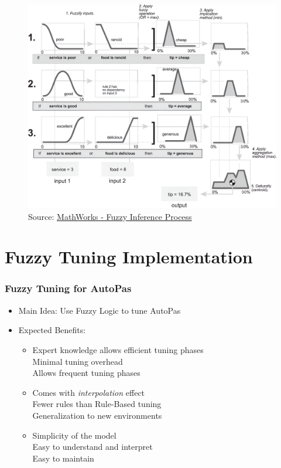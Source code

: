 \documentclass[
	10pt,
	t		%
]{beamer}
\newcommand{\cmark}{\ding{51}}%
\begin{document}
\begin{frame}
	\vspace{-0.8cm}
	\begin{figure}
		\centering
		\caption{\tiny{Source: \href{https://de.mathworks.com/help/fuzzy/fuzzy-inference-process.html}{MathWorks - Fuzzy Inference Process}}}
		\includegraphics[width=0.8\paperwidth]{figures/FullInferenceProcess.png}
	\end{figure}
	\label{fig:fuzzy_inference_full}
	
\end{frame}


\section{Fuzzy Tuning Implementation}
\begin{frame}
	\frametitle{Fuzzy Tuning for AutoPas}
	
	\begin{itemize}
		\item Main Idea: Use Fuzzy Logic to tune AutoPas
		\item Expected Benefits:
		      \begin{itemize}
			      \item Expert knowledge allows efficient tuning phases\\
			            \quad \cmark \; Minimal tuning overhead \\
			            \quad \cmark \; Allows frequent tuning phases
			      \item Comes with \textit{interpolation} effect\\
			            \quad \cmark \; Fewer rules than Rule-Based tuning \\
			            \quad \cmark \; Generalization to new environments
			      \item Simplicity of the model\\
			            \quad \cmark \; Easy to understand and interpret\\
			            \quad \cmark \; Easy to maintain
		      \end{itemize}
	\end{itemize}
\end{frame}
\end{document}
